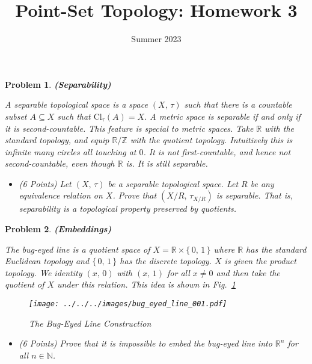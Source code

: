 \documentclass{article}
\title{Point-Set Topology: Homework 3}
\date{Summer 2023}
\theoremstyle{normal}
\newtheorem{problem}{Problem}
\begin{document}
    \maketitle
    \begin{problem}
        \textbf{(Separability)}
        \par\hfill\par
        A separable topological space is a space $(X,\,\tau)$ such that there
        is a countable subset $A\subseteq{X}$ such that
        $\textrm{Cl}_{\tau}(A)=X$.
        A metric space is separable if and only if it is second-countable. This
        feature is special to metric spaces. Take $\mathbb{R}$ with the
        standard topology, and equip $\mathbb{R}/\mathbb{Z}$ with the
        quotient topology. Intuitively this is infinite many circles all
        touching at $0$. It is not first-countable, and hence not
        second-countable, even though $\mathbb{R}$ is. It is still separable.
        \begin{itemize}
            \item (6 Points) Let $(X,\,\tau)$ be a separable topological space.
                Let $R$ be any equivalence relation on $X$. Prove that
                $(X/R,\,\tau_{X/R})$ is separable. That is, separability is
                a topological property preserved by quotients.
        \end{itemize}
    \end{problem}
    \begin{problem}
        \textbf{(Embeddings)}
        \par\hfill\par
        The bug-eyed line is a quotient space of
        $X=\mathbb{R}\times\{\,0,\,1\,\}$ where $\mathbb{R}$ has the standard
        Euclidean topology and $\{\,0,\,1\,\}$ has the discrete topology. $X$
        is given the product topology. We identity
        $(x,\,0)$ with $(x,\,1)$ for all $x\ne{0}$ and then take the quotient
        of $X$ under this relation. This idea is shown in
        Fig.~\ref{fig:bug_eyed_line}
        \begin{figure}
            \centering
            \texttt{[image: ../../../images/bug\_eyed\_line\_001.pdf]}
            \caption{The Bug-Eyed Line Construction}
            \label{fig:bug_eyed_line}
        \end{figure}
        \begin{itemize}
            \item (6 Points) Prove that it is impossible to embed
            the bug-eyed line into $\mathbb{R}^{n}$ for all $n\in\mathbb{N}$.
        \end{itemize}
    \end{problem}
\end{document}
